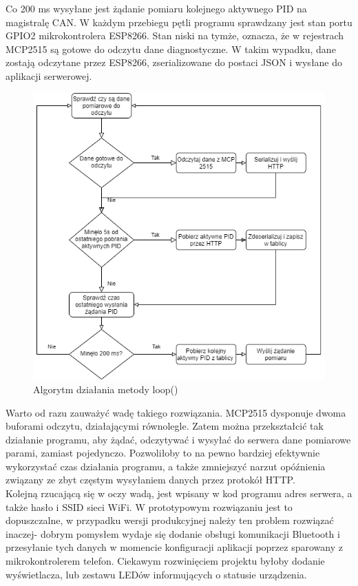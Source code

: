 \documentclass[10pt,a4paper]{scrartcl}
\begin{document}
		Co 200 ms wysyłane jest żądanie pomiaru kolejnego aktywnego PID na magistralę CAN. W każdym przebiegu pętli programu sprawdzany jest stan portu GPIO2 mikrokontrolera ESP8266. Stan niski na tymże, oznacza, że w rejestrach MCP2515 są gotowe do odczytu dane diagnostyczne. W takim wypadku, dane zostają odczytane przez ESP8266, zserializowane do postaci JSON i wysłane do aplikacji serwerowej.
		\begin{figure}[H]
			\centering
			\includegraphics[width=0.5\linewidth]{main_loop.drawio}
			\caption[Algorytm działania metody loop()]{Algorytm działania metody loop()}
			\label{fig:mainloop}
		\end{figure}
		Warto od razu zauważyć wadę takiego rozwiązania. MCP2515 dysponuje dwoma buforami odczytu, działającymi równolegle. Zatem można przekształcić tak działanie programu, aby żądać, odczytywać i wysyłać do serwera dane pomiarowe parami, zamiast pojedynczo. Pozwoliłoby to na pewno bardziej efektywnie wykorzystać czas działania programu, a także zmniejszyć narzut opóźnienia związany ze zbyt częstym wysyłaniem danych przez protokół HTTP.\\
		Kolejną rzucającą się w oczy wadą, jest wpisany w kod programu adres serwera, a także hasło i SSID sieci WiFi. W prototypowym rozwiązaniu jest to dopuszczalne, w przypadku wersji produkcyjnej należy ten problem rozwiązać inaczej- dobrym pomysłem wydaje się dodanie obsługi komunikacji Bluetooth i przesyłanie tych danych w momencie konfiguracji aplikacji poprzez sparowany z mikrokontrolerem telefon. Ciekawym rozwinięciem projektu byłoby dodanie wyświetlacza, lub zestawu LEDów informujących o statusie urządzenia.
		
\end{document}
